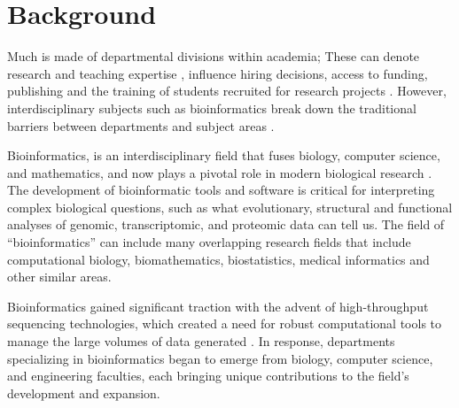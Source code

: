 \documentclass[fleqn,10pt,doc,onecolumn]{SelfArx}%
\affiliation{\textsuperscript{1}\textit{Department of Biochemistry, University of Otago, Dunedin, New Zealand.}} %
\affiliation{*\textbf{Corresponding author}: paul.gardner@otago.ac.nz} %
\begin{document}
\flushbottom %
\maketitle %

\thispagestyle{empty} %


\section*{Background}


Much is made of departmental divisions within academia; These can
denote research and teaching expertise \cite{ben2016s}, influence
hiring decisions, access to funding, publishing and the training of
students recruited for research projects
\cite{bourke1998institutions}. However, interdisciplinary subjects
such as bioinformatics break down the traditional barriers between
departments and subject areas
\cite{Ouzounis:2003,Eddy:2005,hogeweg2011roots}.

Bioinformatics, is an interdisciplinary field that fuses biology,
computer science, and mathematics, and now plays a pivotal role in
modern biological research \cite{Ouzounis:2003}. The development of
bioinformatic tools and software is critical for interpreting complex
biological questions, such as what evolutionary, structural and
functional analyses of genomic, transcriptomic, and proteomic data can
tell us. The field of ``bioinformatics'' can include many overlapping
research fields that include computational biology, biomathematics,
biostatistics, medical informatics and other similar areas.

Bioinformatics gained significant traction with the advent of
high-throughput sequencing technologies, which created a need for
robust computational tools to manage the large volumes of data
generated \cite{Ouzounis:2003,hogeweg2011roots}. In response,
departments specializing in bioinformatics began to emerge from
biology, computer science, and engineering faculties, each bringing
unique contributions to the field's development and expansion.
\end{document}
